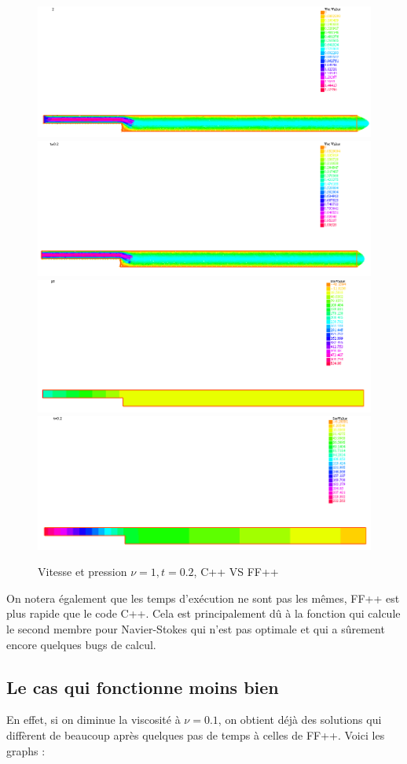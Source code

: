 \documentclass[a4paper,12pt]{article}
\begin{document}
\begin{figure}[!t]
	\caption{Vitesse et pression $\nu = 1,t=0.2$, C++ VS FF++}
	\centering
	\includegraphics[width=0.49\linewidth]{image/c++_NS_nu=1_t=2_u.png}
	\includegraphics[width=0.49\linewidth]{image/ff++_NS_nu=1_t=2_u.png}
	\includegraphics[width=0.49\linewidth]{image/c++_NS_nu=1_t=2_p.png}
	\includegraphics[width=0.49\linewidth]{image/ff++_NS_nu=1_t=2_p.png}
\end{figure}

On notera également que les temps d’exécution ne sont pas les mêmes, FF++ est plus rapide que le code C++. Cela est principalement dû à la fonction qui calcule le second membre pour Navier-Stokes qui n'est pas optimale et qui a sûrement encore quelques bugs de calcul.

\subsection{Le cas qui fonctionne moins bien}

En effet, si on diminue la viscosité à $\nu = 0.1$, on obtient déjà des solutions qui diffèrent de beaucoup après quelques pas de temps à celles de FF++. Voici les graphs :
\end{document}
